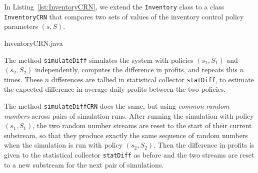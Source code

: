 


\iffalse  %
\setbox1=\vbox{\hsize=5.8in
\begin{verbatim}

REPORT on Tally stat. collector ==> stats on profit
         min        max      average    standard dev.  num. obs
      185.701     188.606    187.114        0.510          500
  90.0% confidence interval for mean (student): (   187.076,   187.151 )

Total CPU time: 0:0:0.60

\end{verbatim}
}

\begin{figure}[htb]
\centerline {\boxit{\box1}}
\
\label {fig:Inventory}
\end{figure}
\fi  %


In Listing~\ref{lst:InventoryCRN}, we extend the \texttt{Inventory} class
to a class \texttt{InventoryCRN} that compares two sets of values
of the inventory control policy parameters $(s,S)$.



{InventoryCRN.java}

The method \texttt{simulateDiff} simulates the system with policies
$(s_1, S_1)$ and $(s_2, S_2)$ independently, computes the difference
in profits, and repeats this $n$ times.  These $n$ differences are
tallied in statistical collector \texttt{statDiff}, to estimate the
expected difference in average daily profits between the two policies.

The method \texttt{simulateDiffCRN} does the same, but using
\emph{common random numbers} across pairs of simulation runs.
After running the simulation with policy $(s_1, S_1)$, the two random
number streams are reset to the start of their current substream,
so that they produce exactly the same sequence of random numbers
when the simulation is run with policy $(s_2, S_2)$.
Then the difference in profits is given to the statistical collector
\texttt{statDiff} as before and the two streams are reset to a
new substream for the next pair of simulations.

